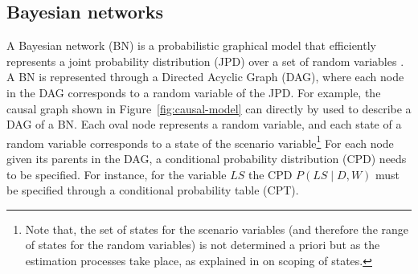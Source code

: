 \documentclass[conference]{IEEEtran}
\begin{document}
\subsection{Bayesian networks}\label{sec:bayesian-networks}


A Bayesian network (BN) is a probabilistic graphical model that efficiently represents a joint probability distribution (JPD) over a set of random variables \cite{jensen01book,pearl88book}. A BN is represented through a Directed Acyclic Graph (DAG), where each node in the DAG corresponds to a random variable of the JPD. For example, the causal graph shown in Figure~\ref{fig:causal-model} can directly by used to describe a DAG of a BN. Each oval node represents a random variable, and each state of a random variable corresponds to a state of the scenario variable\footnote{Note that, the set of states for the scenario variables (and therefore the range of states for the random variables) is not determined a priori but as the estimation processes take place, as explained in \cite{conrado14if} on scoping of states.}
For each node given its parents in the DAG, a conditional probability distribution (CPD) needs to be specified. For instance, for the variable $LS$ the CPD $P(LS\mid D,W)$ must be specified through a conditional probability table (CPT). 

\end{document}
